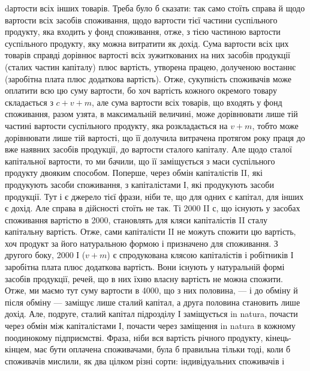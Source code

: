 dартости всіх інших товарів. Треба було б сказати: так само стоїть справа
й щодо вартости всіх засобів споживання, щодо вартости тієї
частини суспільного продукту, яка входить у фонд споживання, отже, з
тією частиною вартости суспільного продукту, яку можна витратити як
дохід. Сума вартости всіх цих товарів справді дорівнює вартості всіх
зужиткованих на них засобів продукції (сталих частин капіталу) плюс
вартість, утворена працею, долученою востаннє (заробітна плата плюс
додаткова вартість). Отже, сукупність споживачів може оплатити всю цю
суму вартости, бо хоч вартість кожного окремого товару складається
з $c + v + m$, але сума вартости всіх товарів, що входять у фонд
споживання, разом узята, в максимальній величині, може дорівнювати лише
тій частині вартости суспільного продукту, яка розкладається на $v + m$,
тобто може дорівнювати лише тій вартості, що її долучила витрачена
протягом року праця до вже наявних засобів продукції, до вартости сталого
капіталу. Але щодо сталої капітальної вартости, то ми бачили, що
її заміщується з маси суспільного продукту двояким способом. Поперше,
через обмін капіталістів II, які продукують засоби споживання, з капіталістами
І, які продукують засоби продукції. Тут і є джерело тієї фрази,
ніби те, що для одних є капітал, для інших є дохід. Але справа в дійсності
стоїть не так. Ті 2000 II с, що існують у засобах споживання вартістю
в 2000, становлять для кляси капіталістів II сталу капітальну вартість.
Отже, сами капіталісти II не можуть спожити цю вартість, хоч продукт
за його натуральною формою і призначено для споживання. З другого
боку, 2000 І ($v + m$) є спродукована клясою капіталістів і робітників І
заробітна плата плюс додаткова вартість. Вони існують у натуральній
формі засобів продукції, речей, що в них їхню власну вартість не можна
спожити. Отже, ми маємо тут суму вартости в 4000, що з них половина,
— і до обміну й після обміну — заміщує лише сталий капітал,
а друга половина становить лише дохід. Але, подруге, сталий капітал
підрозділу І заміщується in natura, почасти через обмін між капіталістами
І, почасти через заміщення in natura в кожному поодинокому підприємстві.
Фраза, ніби вся вартість річного продукту, кінець-кінцем, має бути
оплачена споживачами, була б правильна тільки тоді, коли б споживачів
мислили, як два цілком різні сорти: індивідуальних споживачів і
